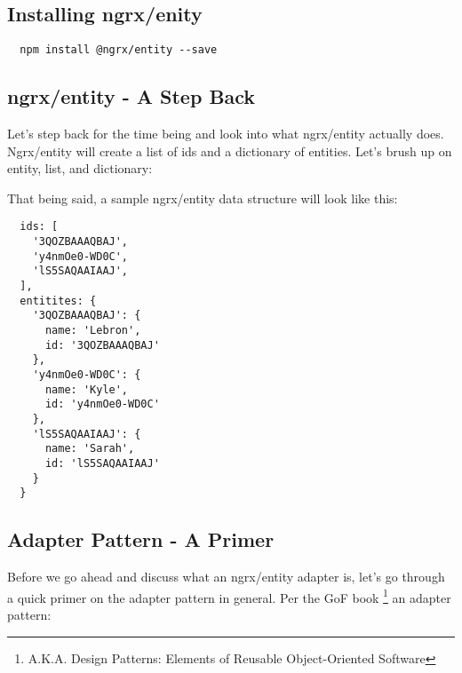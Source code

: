 \subsection{ Installing ngrx/enity }
\begin{verbatim}
  npm install @ngrx/entity --save
\end{verbatim}

\subsection{ ngrx/entity - A Step Back }
Let's step back for the time being and look into what ngrx/entity actually does.
Ngrx/entity will create a list of ids and a dictionary of entities. Let's brush
up on entity, list, and dictionary:

That being said, a sample ngrx/entity data structure will look like this:
\begin{lstlisting}
  ids: [
    '3QOZBAAAQBAJ',
    'y4nmOe0-WD0C',
    'lS5SAQAAIAAJ',
  ],
  entitites: {
    '3QOZBAAAQBAJ': {
      name: 'Lebron',
      id: '3QOZBAAAQBAJ'
    },
    'y4nmOe0-WD0C': {
      name: 'Kyle',
      id: 'y4nmOe0-WD0C'
    },
    'lS5SAQAAIAAJ': {
      name: 'Sarah',
      id: 'lS5SAQAAIAAJ'
    }
  }

\end{lstlisting}

\subsection{ Adapter Pattern - A Primer  }
Before we go ahead and discuss what an ngrx/entity adapter is, let's go through
a quick primer on the adapter pattern in general. Per the GoF book
\footnote{A.K.A. Design Patterns: Elements of Reusable Object-Oriented Software}
an adapter pattern:


